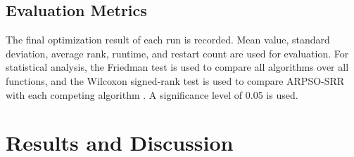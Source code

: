 \documentclass[conference]{IEEEtran}
\begin{document}
\begin{table}[!t]
\caption{Experimental Parameter Settings}
\centering
\scriptsize
\setlength{\tabcolsep}{2.5pt}
\label{tab:parameters}
\end{table}

\subsection{Evaluation Metrics}
The final optimization result of each run is recorded. Mean value, standard deviation, average rank, runtime, and restart count are used for evaluation. For statistical analysis, the Friedman test is used to compare all algorithms over all functions, and the Wilcoxon signed-rank test is used to compare ARPSO-SRR with each competing algorithm \cite{b8,b9,b10}. A significance level of 0.05 is used.

\section{Results and Discussion}\label{sec:results}
\end{document}
